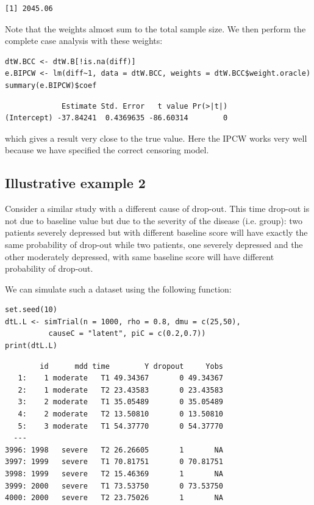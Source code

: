 \documentclass[12pt]{article}
\begin{document}
\begin{verbatim}
[1] 2045.06
\end{verbatim}


Note that the weights almost sum to the total sample size. We then
perform the complete case analysis with these weights:
\lstset{language=r,label= ,caption= ,captionpos=b,numbers=none}
\begin{lstlisting}
dtW.BCC <- dtW.B[!is.na(diff)]
e.BIPCW <- lm(diff~1, data = dtW.BCC, weights = dtW.BCC$weight.oracle)
summary(e.BIPCW)$coef
\end{lstlisting}

\begin{verbatim}
             Estimate Std. Error   t value Pr(>|t|)
(Intercept) -37.84241  0.4369635 -86.60314        0
\end{verbatim}


which gives a result very close to the true value. Here the IPCW works
very well because we have specified the correct censoring model.

\clearpage

\subsection{Illustrative example 2}
\label{sec:org71c30b9}

Consider a similar study with a different cause of drop-out. This time
drop-out is not due to baseline value but due to the severity of the
disease (i.e. group): two patients severely depressed but with
different baseline score will have exactly the same probability of
drop-out while two patients, one severely depressed and the other
moderately depressed, with same baseline score will have different
probability of drop-out.

\bigskip

We can simulate such a dataset using the following function:
\lstset{language=r,label= ,caption= ,captionpos=b,numbers=none}
\begin{lstlisting}
set.seed(10)
dtL.L <- simTrial(n = 1000, rho = 0.8, dmu = c(25,50),
		  causeC = "latent", piC = c(0.2,0.7))
print(dtL.L)
\end{lstlisting}

\begin{verbatim}
        id      mdd time        Y dropout     Yobs
   1:    1 moderate   T1 49.34367       0 49.34367
   2:    1 moderate   T2 23.43583       0 23.43583
   3:    2 moderate   T1 35.05489       0 35.05489
   4:    2 moderate   T2 13.50810       0 13.50810
   5:    3 moderate   T1 54.37770       0 54.37770
  ---                                             
3996: 1998   severe   T2 26.26605       1       NA
3997: 1999   severe   T1 70.81751       0 70.81751
3998: 1999   severe   T2 15.46369       1       NA
3999: 2000   severe   T1 73.53750       0 73.53750
4000: 2000   severe   T2 23.75026       1       NA
\end{verbatim}
\end{document}
